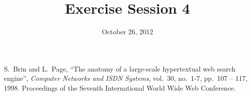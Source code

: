 \documentclass[10pt,a4paper]{article}
\title{Exercise Session 4}
\date{October 26, 2012}
\begin{document}
\lstset{language=[ISO]C++}
\maketitle









%

\begin{thebibliography}{9}

 S.~Brin and L.~Page,
``The anatomy of a large-scale hypertextual web search engine'',
{\em Computer Networks and ISDN Systems}, vol.~30, no.~1-7, pp.~107 -- 117,
1998. Proceedings of the Seventh International World Wide Web Conference.

\end{thebibliography}
\end{document}
